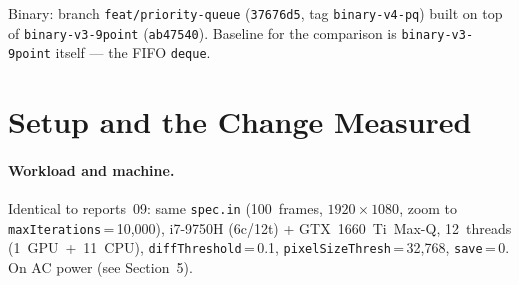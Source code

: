 \documentclass[
	english,
	letterpaper, oneside
]{article}
\begin{document}
\templatePagecfg
\templateFinalcfg

\inserttitle

\begin{center}\small\textsf{%
Binary: branch \texttt{feat/priority-queue} (\texttt{37676d5}, tag
\texttt{binary-v4-pq}) built on top of \texttt{binary-v3-9point}
(\texttt{ab47540}). Baseline for the comparison is \texttt{binary-v3-9point}
itself --- the FIFO \texttt{deque}.%
}\end{center}

\begin{abstract}
\texttt{WorkQueue}'s FIFO \texttt{deque} is replaced with a largest-first
\texttt{priority\_queue} (the existing \texttt{MandelRegion::Compare}, corrected
to order by descending pixel count), in the hope --- per
\texttt{08-region-metrics-viz.tex}'s next-step~4 --- of routing big regions, and
in particular the $\sim$14~s interior outlier, to the fast GPU thread.
Measured against the FIFO baseline on 100~frames at $1920\times1080$
(i7-9750H + GTX~1660~Ti~Max-Q, 12~threads, \texttt{diffT}\,=\,0.1,
\texttt{save}\,=\,0), the change is wall-neutral: 51.09~s vs.\ 51.37~s
over 3~reps each ($-0.55\%$, within noise). The Nsight Systems breakdown shows
why nothing moves: the GPU is equally utilised either way
($\approx$46.5~s busy, $\sim$91\%), the kernel max stays at
$\approx$139~ms in both --- i.e.\ the outlier is never routed to the
GPU; it still lands on a CPU thread (worst region 13.3~$\to$~14.4~s) --- and
total compute is conserved ($\approx$610~s). With eleven CPU workers versus one
GPU thread, a shared largest-first queue hands big regions to whichever
of the twelve extracts next, which is a CPU thread $\sim$11:1; and with the load
already balanced under 2\,\% (report~09), reordering a work-conserving,
throughput-bound schedule has nothing to gain. The report also documents a
methodology near-miss: a battery-power run falsely showed a 2$\times$
``regression'' because the GPU was power-capped to 30~W; an AC-power sanity gate
caught it before any conclusion was drawn.
\end{abstract}

\section{Setup and the Change Measured}

\paragraph{Workload and machine.} Identical to reports~09: same \texttt{spec.in}
(100~frames, $1920\times1080$, zoom to \texttt{maxIterations}\,=\,10{,}000),
i7-9750H (6c/12t) + GTX~1660~Ti~Max-Q, 12~threads (1~GPU~+~11~CPU),
\texttt{diffThreshold}\,=\,0.1, \texttt{pixelSizeThresh}\,=\,32{,}768,
\texttt{save}\,=\,0. On AC power (see Section~5).
\end{document}
